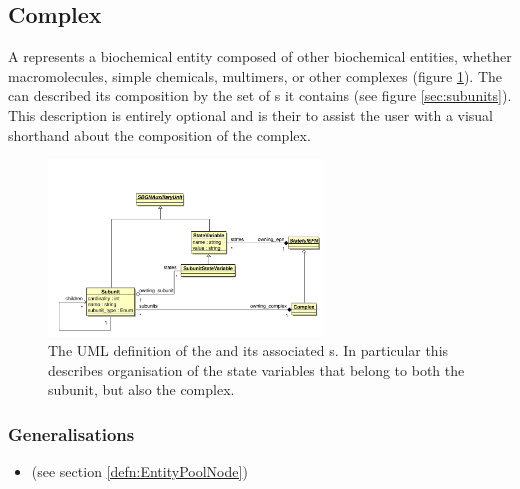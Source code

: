 
\newcommand{\classref}[1]{\sbgnclass{#1} (see section \ref{defn:#1})}
\newenvironment{attributes}{%
\begin{compactitem}}%
  {\end{compactitem}}

\subsection{Complex}\label{sec:complex}

A  represents a biochemical entity composed of
other biochemical entities, whether macromolecules, simple chemicals,
multimers, or other complexes (figure
\ref{fig:complexsubunituml}). The  can described
its composition by the set of s it contains (see
figure \ref{sec:subunits}). This description is entirely optional and
is their to assist the user with a visual shorthand about the
composition of the complex.

\begin{figure}[htb]
  \centering
  \includegraphics[width = 0.65\textwidth]{images/complexsubunituml}
  \caption{The UML definition of the  and its
    associated s. In particular this describes organisation
   of the state variables that belong to both the subunit, but also
   the complex.}
  \label{fig:complexsubunituml}
\end{figure}

\subsubsection{Generalisations}

\begin{itemize}
\item \classref{EntityPoolNode} 
\end{itemize}

